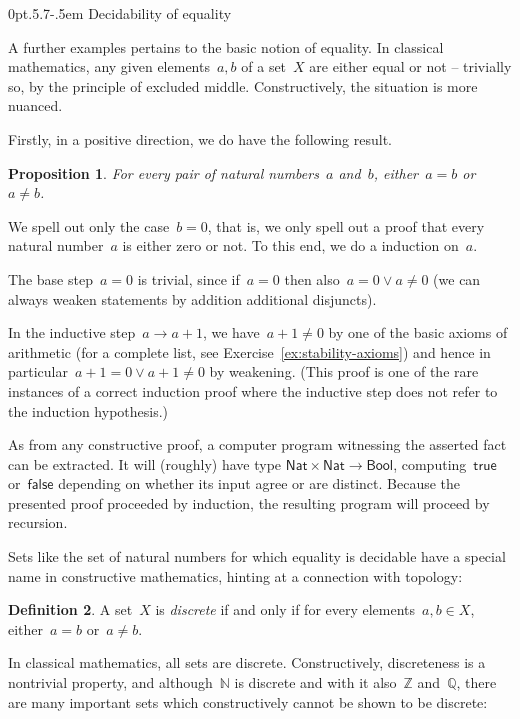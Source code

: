 \documentclass[10pt,reqno,a4paper,openany]{amsbook}
\makeatletter
\theoremstyle{definition}
\newtheorem{defn}{Definition}[chapter]
\theoremstyle{plain}
\newtheorem{prop}[defn]{Proposition}
\theoremstyle{remark}
\newcommand{\ZZ}{\mathbb{Z}}
\newcommand{\NN}{\mathbb{N}}
\newcommand{\QQ}{\mathbb{Q}}
\newcommand{\?}{\,{:}\,}
\renewcommand{\_}{\mathpunct{.}\,}
\renewenvironment{proof}[1][\proofname]{\par
  \pushQED{\qed}%
  \normalfont \topsep6\p@\@plus6\p@\relax
  \trivlist
  \item[\hskip\labelsep
        \itshape
    #1\@addpunct{.}]\ignorespaces
}{%
  \popQED\endtrivlist\@endpefalse
}
\def\subsection{\@startsection{subsection}{2}%
  {0pt}{.5\linespacing\@plus.7\linespacing}{-.5em}%
  {\normalfont\bfseries}}
\makeatother
\begin{document}
\subsection{Decidability of equality}

A further examples pertains to the basic notion of equality. In classical
mathematics, any given elements~$a,b$ of a set~$X$ are either equal or not --
trivially so, by the principle of excluded middle. Constructively, the
situation is more nuanced.

Firstly, in a positive direction, we do have the following result.

\begin{prop}\label{prop:discreteness}
For every pair of natural numbers~$a$ and~$b$, either~$a = b$ or~$a \neq b$.\end{prop}

\begin{proof}[Proof (constructive)]
We spell out only the case~$b = 0$, that is, we only spell out a proof that
every natural number~$a$ is either zero or not. To this end, we do a induction
on~$a$.

The base step~$a = 0$ is trivial, since if~$a = 0$ then also~$a = 0 \vee a \neq
0$ (we can always weaken statements by addition additional disjuncts).

In the inductive step~$a \to a + 1$, we have~$a + 1 \neq 0$ by one of the basic
axioms of arithmetic (for a complete list, see
Exercise~\ref{ex:stability-axioms}) and hence in particular~$a+1 = 0 \vee
a+1\neq0$ by weakening. (This proof is one of the rare instances of a correct
induction proof where the inductive step does not refer to the induction
hypothesis.)
\end{proof}

As from any constructive proof, a computer program witnessing the asserted fact
can be extracted. It will (roughly) have type $\mathsf{Nat} \times \mathsf{Nat}
\to \mathsf{Bool}$, computing~$\mathsf{true}$ or~$\mathsf{false}$ depending on
whether its input agree or are distinct. Because the presented proof proceeded
by induction, the resulting program will proceed by recursion.

Sets like the set of natural numbers for which equality is decidable have a
special name in constructive mathematics, hinting at a connection with topology:
\begin{defn}A set~$X$ is \emph{discrete} if and only if for every
elements~$a,b \in X$, either~$a = b$ or~$a \neq b$.\end{defn}
In classical mathematics, all sets are discrete. Constructively, discreteness
is a nontrivial property, and although~$\NN$ is discrete and with it also~$\ZZ$
and~$\QQ$, there are many important sets which constructively cannot be shown
to be discrete:
\end{document}
